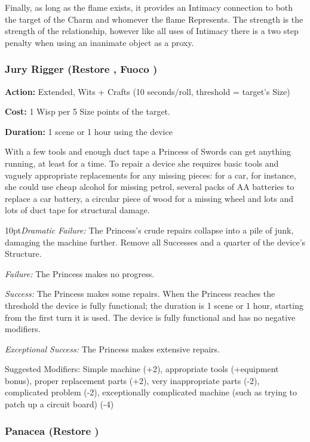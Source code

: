 Finally, as long as the flame exists, it provides an Intimacy connection to both the target of the Charm and whomever the flame Represents. The strength is the strength of the relationship, however like all uses of Intimacy there is a two step penalty when using an inanimate object as a proxy. 

\subsubsection*{Jury Rigger (Restore \textbullet\textbullet, Fuoco \textbullet)}

\noindent \textbf{Action:} Extended, Wits + Crafts (10 seconds/roll, threshold = target's Size)

\noindent \textbf{Cost:} 1 Wisp per 5 Size points of the target.

\noindent \textbf{Duration:} 1 scene or 1 hour using the device

With a few tools and enough duct tape a Princess of Swords can get anything running, at least for a time. To repair a device she requires basic tools and vaguely appropriate replacements for any missing pieces: for a car, for instance, she could use cheap alcohol for missing petrol, several packs of AA batteries to replace a car battery, a circular piece of wood for a missing wheel and lots and lots of duct tape for structural damage.

    \begin{myindentpar}{10pt}\emph{Dramatic Failure:} The Princess's crude repairs collapse into a pile of junk, damaging the machine further. Remove all Successes and a quarter of the device's Structure.

    \emph{Failure:} The Princess makes no progress.

    \emph{Success:} The Princess makes some repairs. When the Princess reaches the threshold the device is fully functional; the duration is 1 scene or 1 hour, starting from the first turn it is used. The device is fully functional and has no negative modifiers. 

    \emph{Exceptional Success:} The Princess makes extensive repairs.\end{myindentpar}

Suggested Modifiers: Simple machine (+2), appropriate tools (+equipment bonus), proper replacement parts (+2), very inappropriate parts (-2), complicated problem (-2), exceptionally complicated machine (such as trying to patch up a circuit board) (-4)

\subsubsection*{Panacea (Restore \textbullet\textbullet)}

